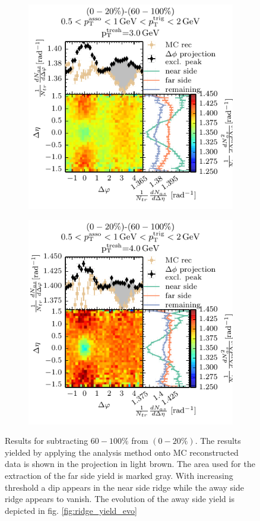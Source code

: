 \begin{figure}
  \begin{subfigure}[b]{0.5\textwidth}
    \includegraphics[]{figures/05_12_sub_thresh_30.pdf}
  \end{subfigure}%
  \begin{subfigure}[b]{0.5\textwidth}
    \includegraphics[]{figures/05_12_sub_thresh_40.pdf}
  \end{subfigure}
  \caption[Results for subtracting $60-100\%$ from $(0-20\%)$ for various thresholds.]{Results for subtracting $60-100\%$ from $(0-20\%)$. The results yielded by applying the analysis method onto MC reconstructed data is shown in the \dphi projection in light brown. The area used for the extraction of the far side yield is marked gray. With increasing threshold a dip appears in the near side ridge while the away side ridge appears to vanish. The evolution of the away side yield is depicted in fig. \ref{fig:ridge_yield_evo} }
  \label{fig:subtractions_high_pt}
\end{figure}

